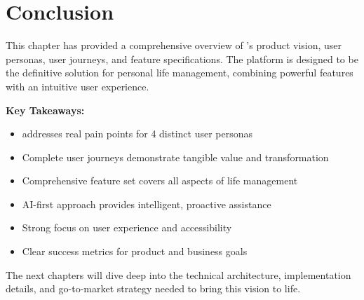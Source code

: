 \section{Conclusion}

This chapter has provided a comprehensive overview of \lifeos{}'s product vision, user personas, user journeys, and feature specifications. The platform is designed to be the definitive solution for personal life management, combining powerful features with an intuitive user experience.

\textbf{Key Takeaways:}

\begin{itemize}
    \item \lifeos{} addresses real pain points for 4 distinct user personas
    \item Complete user journeys demonstrate tangible value and transformation
    \item Comprehensive feature set covers all aspects of life management
    \item AI-first approach provides intelligent, proactive assistance
    \item Strong focus on user experience and accessibility
    \item Clear success metrics for product and business goals
\end{itemize}

The next chapters will dive deep into the technical architecture, implementation details, and go-to-market strategy needed to bring this vision to life.
